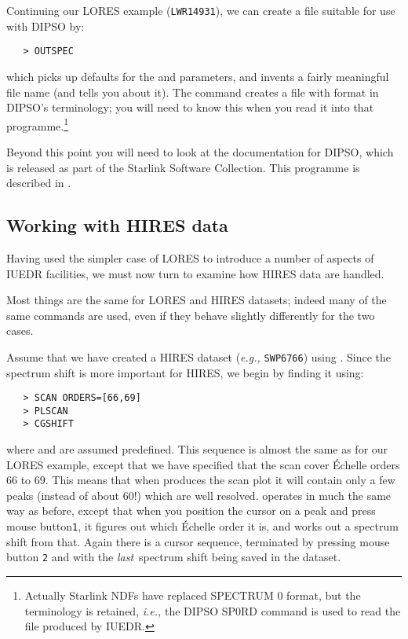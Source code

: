Continuing our LORES example (\verb+LWR14931+), we can create a file suitable
for use with DIPSO by:

\begin{verbatim}
   > OUTSPEC
\end{verbatim}

which picks up defaults for the 
 and 
 parameters,
and invents a fairly meaningful file name (and tells you about it)\@.  The
 command creates a file with format  in DIPSO's
terminology; you will need to know this when you read it into that
programme.\footnote{Actually Starlink NDFs have replaced SPECTRUM 0 format,
but the terminology is retained, {\it{i.e.,}} the DIPSO SP0RD command is used
to read the file produced by IUEDR\@.}

Beyond this point you will need to look at the documentation for DIPSO,
which is released as part of the Starlink Software Collection. This programme
is described in .


\subsection{Working with HIRES data}

Having used the simpler case of LORES to introduce a number of aspects of
IUEDR facilities, we must now turn to examine how HIRES data are handled.

Most things are the same for LORES and HIRES datasets; indeed many of the
same commands are used, even if they behave slightly differently for the two
cases.

Assume that we have created a HIRES dataset ({\it{e.g.,}} \verb+SWP6766+) using
\@.  Since the spectrum shift is more
important for HIRES, we begin by finding it using:

\begin{verbatim}
   > SCAN ORDERS=[66,69]
   > PLSCAN
   > CGSHIFT
\end{verbatim}

where 
 and 
 are assumed predefined.  This sequence
is almost the same as for our LORES example, except that we have specified that
the scan cover \'{E}chelle orders 66 to 69.  This means that when 
produces the scan plot it will contain only a few peaks (instead of about 60!)
which are well resolved.  
 operates in much the same way as
before, except that when you position the cursor on a peak and press mouse
button\verb+1+, it figures out which \'{E}chelle order it is, and works out a
spectrum shift from that.  Again there is a cursor sequence, terminated by
pressing mouse button \verb+2+ and with the {\em last\,} spectrum shift being
saved in the dataset.

